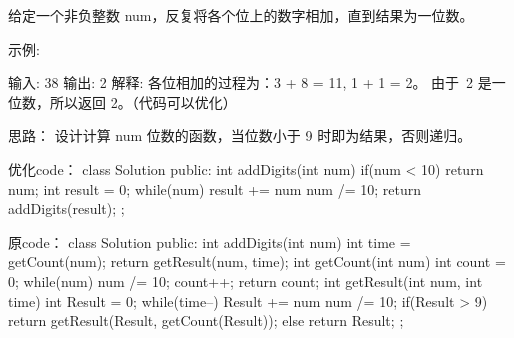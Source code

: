 给定一个非负整数 num，反复将各个位上的数字相加，直到结果为一位数。

示例:

输入: 38
输出: 2 
解释: 各位相加的过程为：3 + 8 = 11, 1 + 1 = 2。 由于 2 是一位数，所以返回 2。（代码可以优化）


















思路：
设计计算 num 位数的函数，当位数小于 9 时即为结果，否则递归。























优化code：
class Solution {
public:
    int addDigits(int num) {
        if(num < 10) return num;
        int result = 0;
        while(num)
        {
            result += num %
            num /= 10;
        }
        return addDigits(result);
    }
};

















原code：
class Solution {
public:
    int addDigits(int num) {
        int time = getCount(num);
        return getResult(num, time);
    }
    int getCount(int num)
    {
        int count = 0;
        while(num)
        {
            num /= 10;
            count++;
        }
        return count;
    }
    int getResult(int num, int time)
    {
        int Result = 0;
        while(time--)
        {
            Result += num %
            num /= 10;
        }
        if(Result > 9)
            return getResult(Result, getCount(Result));
        else return Result;
    }
};